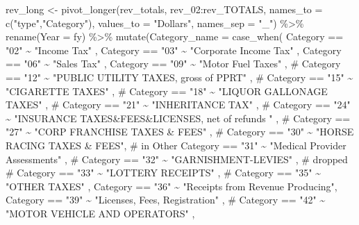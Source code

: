 \documentclass[
  letterpaper,
  DIV=11,
  numbers=noendperiod]{scrreport}
\newenvironment{Shaded}{\begin{snugshade}}{\end{snugshade}}
\newcommand{\AttributeTok}[1]{\textcolor[rgb]{0.40,0.45,0.13}{#1}}
\newcommand{\CommentTok}[1]{\textcolor[rgb]{0.37,0.37,0.37}{#1}}
\newcommand{\FunctionTok}[1]{\textcolor[rgb]{0.28,0.35,0.67}{#1}}
\newcommand{\NormalTok}[1]{\textcolor[rgb]{0.00,0.23,0.31}{#1}}
\newcommand{\OtherTok}[1]{\textcolor[rgb]{0.00,0.23,0.31}{#1}}
\newcommand{\SpecialCharTok}[1]{\textcolor[rgb]{0.37,0.37,0.37}{#1}}
\newcommand{\StringTok}[1]{\textcolor[rgb]{0.13,0.47,0.30}{#1}}
\begin{document}
\begin{Shaded}
\begin{Highlighting}[]
\NormalTok{rev\_long }\OtherTok{\textless{}{-}} \FunctionTok{pivot\_longer}\NormalTok{(rev\_totals, rev\_02}\SpecialCharTok{:}\NormalTok{rev\_TOTALS, }\AttributeTok{names\_to =} \FunctionTok{c}\NormalTok{(}\StringTok{"type"}\NormalTok{,}\StringTok{"Category"}\NormalTok{), }\AttributeTok{values\_to =} \StringTok{"Dollars"}\NormalTok{, }\AttributeTok{names\_sep =} \StringTok{"\_"}\NormalTok{) }\SpecialCharTok{\%\textgreater{}\%} 
  \FunctionTok{rename}\NormalTok{(}\AttributeTok{Year =}\NormalTok{ fy) }\SpecialCharTok{\%\textgreater{}\%}
  \FunctionTok{mutate}\NormalTok{(}\AttributeTok{Category\_name =} \FunctionTok{case\_when}\NormalTok{(}
\NormalTok{    Category }\SpecialCharTok{==} \StringTok{"02"} \SpecialCharTok{\textasciitilde{}} \StringTok{"Income Tax"}\NormalTok{ ,}
\NormalTok{    Category }\SpecialCharTok{==} \StringTok{"03"} \SpecialCharTok{\textasciitilde{}} \StringTok{"Corporate Income Tax"}\NormalTok{ ,}
\NormalTok{    Category }\SpecialCharTok{==} \StringTok{"06"} \SpecialCharTok{\textasciitilde{}} \StringTok{"Sales Tax"}\NormalTok{ ,}
\NormalTok{    Category }\SpecialCharTok{==} \StringTok{"09"} \SpecialCharTok{\textasciitilde{}} \StringTok{"Motor Fuel Taxes"}\NormalTok{ ,}
 \CommentTok{\#   Category == "12" \textasciitilde{} "PUBLIC UTILITY TAXES, gross of PPRT" ,}
  \CommentTok{\#  Category == "15" \textasciitilde{} "CIGARETTE TAXES" ,}
 \CommentTok{\#   Category == "18" \textasciitilde{} "LIQUOR GALLONAGE TAXES" ,}
 \CommentTok{\#  Category == "21" \textasciitilde{} "INHERITANCE TAX" ,}
  \CommentTok{\#  Category == "24" \textasciitilde{} "INSURANCE TAXES\&FEES\&LICENSES, net of refunds " ,}
   \CommentTok{\# Category == "27" \textasciitilde{} "CORP FRANCHISE TAXES \& FEES" ,}
 \CommentTok{\#   Category == "30" \textasciitilde{} "HORSE RACING TAXES \& FEES",  \# in Other}
\NormalTok{    Category }\SpecialCharTok{==} \StringTok{"31"} \SpecialCharTok{\textasciitilde{}} \StringTok{"Medical Provider Assessments"}\NormalTok{ ,}
  \CommentTok{\#  Category == "32" \textasciitilde{} "GARNISHMENT{-}LEVIES" , \# dropped}
  \CommentTok{\#  Category == "33" \textasciitilde{}  "LOTTERY RECEIPTS" ,}
   \CommentTok{\# Category == "35" \textasciitilde{}  "OTHER TAXES" ,}
\NormalTok{    Category }\SpecialCharTok{==} \StringTok{"36"} \SpecialCharTok{\textasciitilde{}}  \StringTok{"Receipts from Revenue Producing"}\NormalTok{, }
\NormalTok{    Category }\SpecialCharTok{==} \StringTok{"39"} \SpecialCharTok{\textasciitilde{}}  \StringTok{"Licenses, Fees, Registration"}\NormalTok{ ,}
   \CommentTok{\# Category == "42" \textasciitilde{}  "MOTOR VEHICLE AND OPERATORS" ,}

\end{Highlighting}
\end{Shaded}
\end{document}
